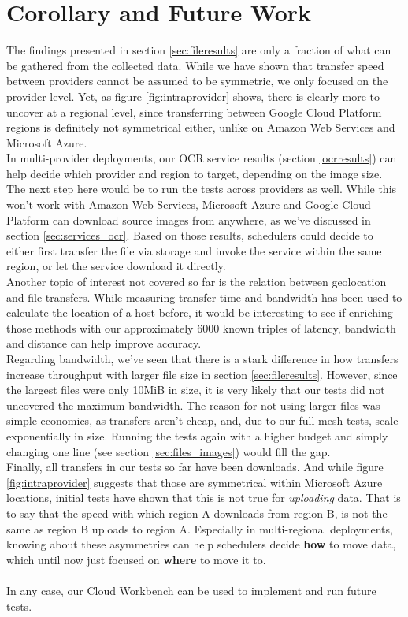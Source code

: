 \documentclass[a4paper,bibliography=totoc]{scrartcl}
\newcommand{\Azure}{Microsoft Azure\xspace}
\newcommand{\GCP}{Google Cloud Platform\xspace}
\newcommand{\AWS}{Amazon Web Services\xspace}
\begin{document}
\section{Corollary and Future Work}\label{sec:future}
The findings presented in section \ref{sec:fileresults} are only a fraction of what can be gathered from the collected data. While we have shown that transfer speed between providers cannot be assumed to be symmetric, we only focused on the provider level. Yet, as figure \ref{fig:intraprovider} shows, there is clearly more to uncover at a regional level, since transferring between \GCP regions is definitely not symmetrical either, unlike on \AWS and \Azure.\\
In multi-provider deployments, our OCR service results (section \ref{ocrresults}) can help decide which provider and region to target, depending on the image size. The next step here would be to run the tests across providers as well. While this won't work with \AWS, \Azure and \GCP can download source images from anywhere, as we've discussed in section \ref{sec:services_ocr}. Based on those results, schedulers could decide to either first transfer the file via storage and invoke the service within the same region, or let the service download it directly.\\
Another topic of interest not covered so far is the relation between geolocation and file transfers. While measuring transfer time and bandwidth has been used to calculate the location of a host before,\cite{geolocation1,geolocation2} it would be interesting to see if enriching those methods with our approximately 6000 known triples of latency, bandwidth and distance can help improve accuracy.\\
Regarding bandwidth, we've seen that there is a stark difference in how transfers increase throughput with larger file size in section \ref{sec:fileresults}. However, since the largest files were only 10MiB in size, it is very likely that our tests did not uncovered the maximum bandwidth. The reason for not using larger files was simple economics, as transfers aren't cheap,\cite{azure_bandwidth_costs} and, due to our full-mesh tests, scale exponentially in size. Running the tests again with a higher budget and simply changing one line (see section \ref{sec:files_images}) would fill the gap.\\
Finally, all transfers in our tests so far have been downloads. And while figure \ref{fig:intraprovider} suggests that those are symmetrical within \Azure locations, initial tests have shown that this is not true for \textit{uploading} data. That is to say that the speed with which region A downloads from region B, is not the same as region B uploads to region A. Especially in multi-regional deployments, knowing about these asymmetries can help schedulers decide \textbf{how} to move data, which until now just focused on \textbf{where} to move it to.\\
\\
In any case, our Cloud Workbench can be used to implement and run future tests.
\end{document}
